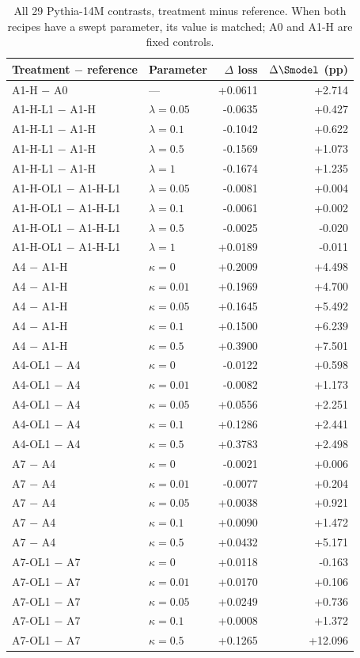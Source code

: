 \begin{table}[p]\centering\small\renewcommand{\arraystretch}{0.95}
\caption{All 29 Pythia-14M contrasts, treatment minus reference. When both recipes have a swept parameter, its value is matched; A0 and A1-H are fixed controls.}\label{tab:paired-effects-full}
\begin{tabular}{@{}llrr@{}}
\toprule
Treatment $-$ reference & Parameter & $\Delta$ loss & $\Delta\Smodel$ (pp) \\
\midrule
A1-H $-$ A0 & --- & +0.0611 & +2.714 \\
A1-H-L1 $-$ A1-H & $\lambda=0.05$ & -0.0635 & +0.427 \\
A1-H-L1 $-$ A1-H & $\lambda=0.1$ & -0.1042 & +0.622 \\
A1-H-L1 $-$ A1-H & $\lambda=0.5$ & -0.1569 & +1.073 \\
A1-H-L1 $-$ A1-H & $\lambda=1$ & -0.1674 & +1.235 \\
A1-H-OL1 $-$ A1-H-L1 & $\lambda=0.05$ & -0.0081 & +0.004 \\
A1-H-OL1 $-$ A1-H-L1 & $\lambda=0.1$ & -0.0061 & +0.002 \\
A1-H-OL1 $-$ A1-H-L1 & $\lambda=0.5$ & -0.0025 & -0.020 \\
A1-H-OL1 $-$ A1-H-L1 & $\lambda=1$ & +0.0189 & -0.011 \\
A4 $-$ A1-H & $\kappa=0$ & +0.2009 & +4.498 \\
A4 $-$ A1-H & $\kappa=0.01$ & +0.1969 & +4.700 \\
A4 $-$ A1-H & $\kappa=0.05$ & +0.1645 & +5.492 \\
A4 $-$ A1-H & $\kappa=0.1$ & +0.1500 & +6.239 \\
A4 $-$ A1-H & $\kappa=0.5$ & +0.3900 & +7.501 \\
A4-OL1 $-$ A4 & $\kappa=0$ & -0.0122 & +0.598 \\
A4-OL1 $-$ A4 & $\kappa=0.01$ & -0.0082 & +1.173 \\
A4-OL1 $-$ A4 & $\kappa=0.05$ & +0.0556 & +2.251 \\
A4-OL1 $-$ A4 & $\kappa=0.1$ & +0.1286 & +2.441 \\
A4-OL1 $-$ A4 & $\kappa=0.5$ & +0.3783 & +2.498 \\
A7 $-$ A4 & $\kappa=0$ & -0.0021 & +0.006 \\
A7 $-$ A4 & $\kappa=0.01$ & -0.0077 & +0.204 \\
A7 $-$ A4 & $\kappa=0.05$ & +0.0038 & +0.921 \\
A7 $-$ A4 & $\kappa=0.1$ & +0.0090 & +1.472 \\
A7 $-$ A4 & $\kappa=0.5$ & +0.0432 & +5.171 \\
A7-OL1 $-$ A7 & $\kappa=0$ & +0.0118 & -0.163 \\
A7-OL1 $-$ A7 & $\kappa=0.01$ & +0.0170 & +0.106 \\
A7-OL1 $-$ A7 & $\kappa=0.05$ & +0.0249 & +0.736 \\
A7-OL1 $-$ A7 & $\kappa=0.1$ & +0.0008 & +1.372 \\
A7-OL1 $-$ A7 & $\kappa=0.5$ & +0.1265 & +12.096 \\
\bottomrule
\end{tabular}
\end{table}
